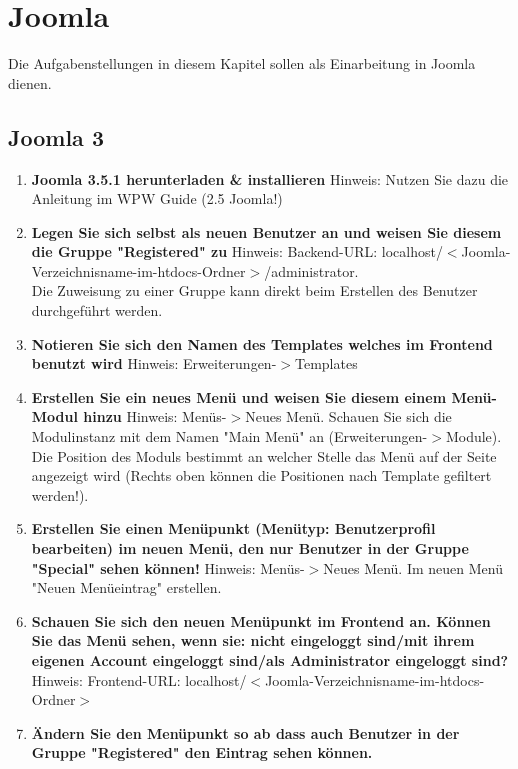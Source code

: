 \documentclass[]{article}
\begin{document}
\section{Joomla}
Die Aufgabenstellungen in diesem Kapitel sollen als Einarbeitung in Joomla dienen.
\subsection{Joomla 3}
\begin{enumerate}
\item \textbf{Joomla 3.5.1 herunterladen \& installieren} \newline Hinweis: Nutzen Sie dazu die Anleitung im WPW Guide (2.5 Joomla!)
\item \textbf{Legen Sie sich selbst als neuen Benutzer an und weisen Sie diesem die Gruppe "Registered" zu} \newline
Hinweis: Backend-URL: localhost/$ < $Joomla-Verzeichnisname-im-htdocs-Ordner$ > $/administrator. \\
Die Zuweisung zu einer Gruppe kann direkt beim Erstellen des Benutzer durchgeführt werden.
\item \textbf{Notieren Sie sich den Namen des Templates welches im Frontend benutzt wird} \newline
Hinweis: Erweiterungen-$ > $Templates
\item \textbf{Erstellen Sie ein neues Menü und weisen Sie diesem einem Menü-Modul hinzu} \newline
Hinweis: Menüs-$ > $Neues Menü. Schauen Sie sich die Modulinstanz mit dem Namen "Main Menü" an (Erweiterungen-$>$Module). Die Position des Moduls bestimmt an welcher Stelle das Menü auf der Seite angezeigt wird (Rechts oben können die Positionen nach Template gefiltert werden!).
\item \textbf{Erstellen Sie einen Menüpunkt (Menütyp: Benutzerprofil bearbeiten) im neuen Menü, den nur Benutzer in der Gruppe "Special" sehen können!} \newline
Hinweis: Menüs-$ > $Neues Menü. Im neuen Menü "Neuen Menüeintrag" erstellen.
\item \textbf{Schauen Sie sich den neuen Menüpunkt im Frontend an. Können Sie das Menü sehen, wenn sie: nicht eingeloggt sind/mit ihrem eigenen Account eingeloggt sind/als Administrator eingeloggt sind?} \newline
Hinweis: Frontend-URL: localhost/$ < $Joomla-Verzeichnisname-im-htdocs-Ordner$ > $ 
\item \textbf{Ändern Sie den Menüpunkt so ab dass auch Benutzer in der Gruppe "Registered" den Eintrag sehen können.}

\end{enumerate}
\end{document}
